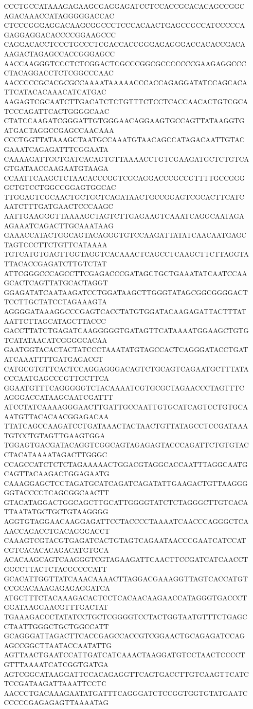 CCCTGCCATAAAGAGAAGCGAGGAGATCCTCCACCGCACACAGCCGGCAGACAAACCATAGGGGGACCAC
CTCCCGGGAGGACAAGCGGCCCTCCCACAACTGAGCCGCCATCCCCCAGAGGAGGACACCCCGGAAGCCC
CAGGACACCTCCCTGCCCTCGACCACCGGGAGAGGGACCACACCGACAAAGACTAGAGCCACCGGGAGCC
AACCAAGGGTCCCTCTCGGACTCGCCCGGCGCCCCCCCGAAGAGGCCCCTACAGGACCTCTCGGCCCAAC
AACCCCCGCACGCGCCAAAATAAAAACCCACCAGAGGATATCCAGCACATTCATACACAAACATCATGAC
AAGAGTCGCAATCTTGACATCTCTGTTTCTCCTCACCAACACTGTCGCATCCCAGATTCACTGGGGCAAC
CTATCCAAGATCGGGATTGTGGGAACAGGAAGTGCCAGTTATAAGGTGATGACTAGGCCGAGCCAACAAA
CCCTGGTTATAAAGCTAATGCCAAATGTAACAGCCATAGACAATTGTACGAAATCAGAGATTTCGGAATA
CAAAAGATTGCTGATCACAGTGTTAAAACCTGTCGAAGATGCTCTGTCAGTGATAACCAAGAATGTAAGA
CCAATTCAAGCTCTAACACCCGGTCGCAGGACCCGCCGTTTTGCCGGGGCTGTCCTGGCCGGAGTGGCAC
TTGGAGTCGCAACTGCTGCTCAGATAACTGCCGGAGTCGCACTTCATCAATCTTTGATGAACTCCCAAGC
AATTGAAGGGTTAAAAGCTAGTCTTGAGAAGTCAAATCAGGCAATAGAAGAAATCAGACTTGCAAATAAG
GAAACCATACTGGCAGTACAGGGTGTCCAAGATTATATCAACAATGAGCTAGTCCCTTCTGTTCATAAAA
TGTCATGTGAGTTGGTAGGTCACAAACTCAGCCTCAAGCTTCTTAGGTATTACACCGAGATCTTGTCTAT
ATTCGGGCCCAGCCTTCGAGACCCGATAGCTGCTGAAATATCAATCCAAGCACTCAGTTATGCACTAGGT
GGAGATATCAATAAGATCCTGGATAAGCTTGGGTATAGCGGCGGGGACTTCCTTGCTATCCTAGAAAGTA
AGGGGATAAAGGCCCGAGTCACCTATGTGGATACAAGAGATTACTTTATAATTCTTAGCATAGCTTACCC
GACCTTATCTGAGATCAAGGGGGTGATAGTTCATAAAATGGAAGCTGTGTCATATAACATCGGGGCACAA
GAATGGTACACTACTATCCCTAAATATGTAGCCACTCAGGGATACCTGATATCAAATTTTGATGAGACGT
CATGCGTGTTCACTCCAGGAGGGACAGTCTGCAGTCAGAATGCTTTATACCCAATGAGCCCGTTGCTTCA
GGAATGTTTCAGGGGGTCTACAAAATCGTGCGCTAGAACCCTAGTTTCAGGGACCATAAGCAATCGATTT
ATCCTATCAAAAGGGAACTTGATTGCCAATTGTGCATCAGTCCTGTGCAAATGTTACACAACGGAGACAA
TTATCAGCCAAGATCCTGATAAACTACTAACTGTTATAGCCTCCGATAAATGTCCTGTAGTTGAAGTGGA
TGGAGTGACGATACAGGTCGGCAGTAGAGAGTACCCAGATTCTGTGTACCTACATAAAATAGACTTGGGC
CCAGCCATCTCTCTAGAAAAACTGGACGTAGGCACCAATTTAGGCAATGCAGTTACAAGACTGGAGAATG
CAAAGGAGCTCCTAGATGCATCAGATCAGATATTGAAGACTGTTAAGGGGGTACCCCTCAGCGGCAACTT
GTACATAGGACTGGCAGCTTGCATTGGGGTATCTCTAGGGCTTGTCACATTAATATGCTGCTGTAAGGGG
AGGTGTAGGAACAAGGAGATTCCTACCCCTAAAATCAACCCAGGGCTCAAACCAGACCTGACAGGGACCT
CAAAGTCGTACGTGAGATCACTGTAGTCAGAATAACCCGAATCATCCATCGTCACACACAGACATGTGCA
ACACAAGCAGTCAAGGGTCGTAGAAGATTCAACTTCCGATCATCAACCTGGCCTTACTCTACGCCCCATT
GCACATTGGTTATCAAACAAAACTTAGGACGAAAGGTTAGTCACCATGTCCGCACAAAGAGAGAGGATCA
ATGCTTTCTACAAAGACACTCCTCACAACAAGAACCATAGGGTGACCCTGGATAAGGAACGTTTGACTAT
TGAAAGACCCTATATCCTGCTCGGGGTCCTACTGGTAATGTTTCTGAGCCTAATTGGGCTGCTGGCCATT
GCAGGGATTAGACTTCACCGAGCCACCGTCGGAACTGCAGAGATCCAGAGCCGGCTTAATACCAATATTG
AGTTAACTGAATCCATTGATCATCAAACTAAGGATGTCCTAACTCCCCTGTTTAAAATCATCGGTGATGA
AGTCGGCATAAGGATTCCACAGAGGTTCAGTGACCTTGTCAAGTTCATCTCCGATAAGATTAAATTCCTC
AACCCTGACAAAGAATATGATTTCAGGGATCTCCGGTGGTGTATGAATCCCCCCGAGAGAGTTAAAATAG
